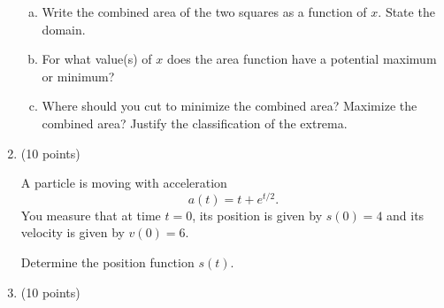 \documentclass[11pt]{article}
\def\be{\begin{enumerate}}
\def\ee{\end{enumerate}}
\begin{document}
\begin{enumerate}
\begin{enumerate}[(a)]
	\item Write the combined area of the two squares as a function of $x$. State the domain.
	\vfill
	\item For what value(s) of $x$ does the area function have a potential maximum or minimum?
	\vfill
	\item Where should you cut to minimize the combined area? Maximize the combined area? Justify the classification of the extrema.
	\vfill
\end{enumerate}

\newpage
%

%
%


%
%
%
%
%
%

\newpage




\item (10 points)


A particle is moving with acceleration
\[a(t) = t+e^{t/2}.\]
You measure that at time $t = 0$, its position is given by $s(0) = 4$ and its velocity is given by $v(0) = 6$.

Determine the position function $s(t)$. 
\vfill

%
%
%
%
\newpage
\item (10 points)


\end{enumerate}
\end{document}

